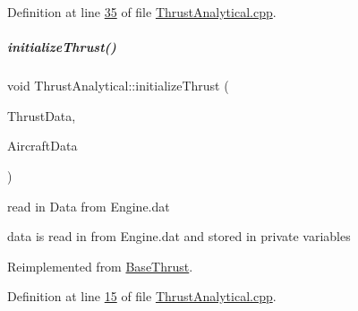 Definition at line \hyperlink{_thrust_analytical_8cpp_source_l00035}{35} of file \hyperlink{_thrust_analytical_8cpp_source}{Thrust\+Analytical.\+cpp}.

\mbox{\label{group___engine_a2bdad8d5195990b3bcb0139bc408f199}} 
\subparagraph{\texorpdfstring{initialize\+Thrust()}{initializeThrust()}}
{\footnotesize\ttfamily void Thrust\+Analytical\+::initialize\+Thrust (\begin{DoxyParamCaption}\item[{Thrust\+Struct \&}]{Thrust\+Data,  }\item[{Aircraft\+Struct \&}]{Aircraft\+Data }\end{DoxyParamCaption})\hspace{0.3cm}{\ttfamily [virtual]}}



read in Data from Engine.\+dat 

data is read in from Engine.\+dat and stored in private variables 

Reimplemented from \hyperlink{group___engine}{Base\+Thrust}.



Definition at line \hyperlink{_thrust_analytical_8cpp_source_l00015}{15} of file \hyperlink{_thrust_analytical_8cpp_source}{Thrust\+Analytical.\+cpp}.

